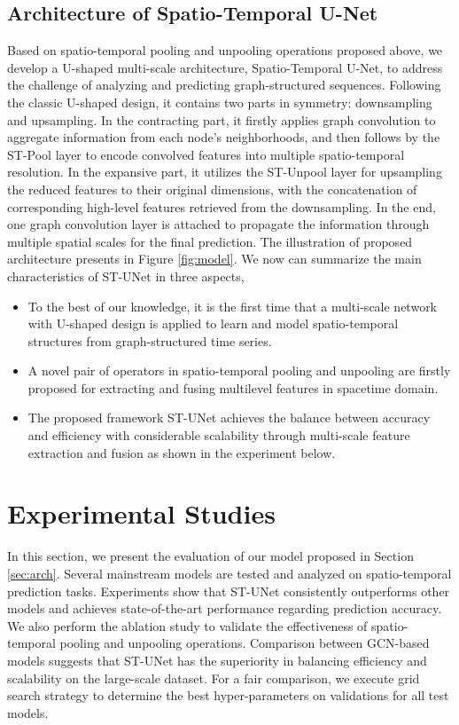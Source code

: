 \documentclass[sigconf,screen]{acmart}
\begin{document}
\subsection{\label{sec:arch}Architecture of Spatio-Temporal U-Net}
Based on spatio-temporal pooling and unpooling operations proposed above, we develop a U-shaped multi-scale architecture, Spatio-Temporal U-Net, to address the challenge of analyzing and predicting graph-structured sequences. Following the classic U-shaped design, it contains two parts in symmetry: downsampling and upsampling. In the contracting part, it firstly applies graph convolution to aggregate information from each node's neighborhoods, and then follows by the ST-Pool layer to encode convolved features into multiple spatio-temporal resolution. In the expansive part, it utilizes the ST-Unpool layer for upsampling the reduced features to their original dimensions, with the concatenation of corresponding high-level features retrieved from the downsampling. In the end, one graph convolution layer is attached to propagate the information through multiple spatial scales for the final prediction. The illustration of proposed architecture presents in Figure \ref{fig:model}. We now can summarize the main characteristics of ST-UNet in three aspects,
\begin{itemize}
	\item To the best of our knowledge, it is the first time that a multi-scale network with U-shaped design is applied to learn and model spatio-temporal structures from graph-structured time series.
	\item A novel pair of operators in spatio-temporal pooling and unpooling are firstly proposed for extracting and fusing multilevel features in spacetime domain.
	\item The proposed framework ST-UNet achieves the balance between accuracy and efficiency with considerable scalability through multi-scale feature extraction and fusion as shown in the experiment below.
\end{itemize}


\section{Experimental Studies}
In this section, we present the evaluation of our model proposed in Section \ref{sec:arch}. Several mainstream models are tested and analyzed on spatio-temporal prediction tasks. Experiments show that ST-UNet consistently outperforms other models and achieves state-of-the-art performance regarding prediction accuracy. We also perform the ablation study to validate the effectiveness of spatio-temporal pooling and unpooling operations. Comparison between GCN-based models suggests that ST-UNet has the superiority in balancing efficiency and scalability on the large-scale dataset. For a fair comparison, we execute grid search strategy to determine the best hyper-parameters on validations for all test models.
\end{document}
